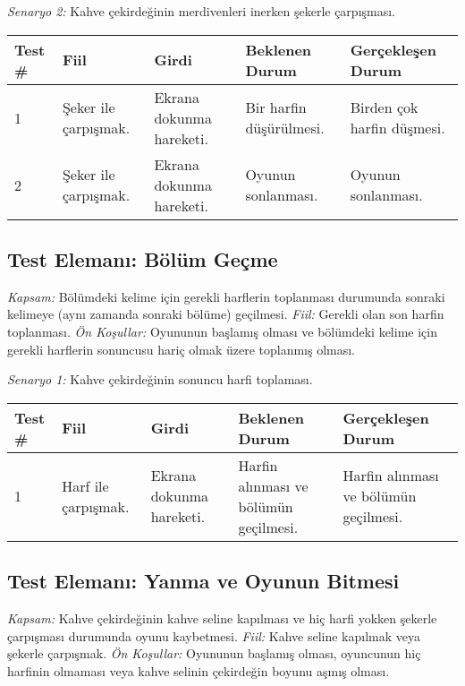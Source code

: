 \documentclass[12pt,a4paper]{article}
\begin{document}
   \textit{Senaryo 2:} Kahve çekirdeğinin merdivenleri inerken şekerle çarpışması.

   \begin{center}
      \begin{tabular}{ | l | p{3cm} | p{3cm} | p{3cm} | p{5cm} | }
      \hline
      Test \# & Fiil & Girdi & Beklenen Durum & Gerçekleşen Durum \\ \hline
      1 & Şeker ile çarpışmak. & Ekrana dokunma hareketi. & Bir harfin düşürülmesi. & Birden çok harfin düşmesi. \\ \hline
      2 & Şeker ile çarpışmak. & Ekrana dokunma hareketi. & Oyunun sonlanması. & Oyunun sonlanması. \\ \hline
      \end{tabular}
   \end{center}

   \subsection{Test Elemanı: Bölüm Geçme}
   \textit{Kapsam:} Bölümdeki kelime için gerekli harflerin toplanması durumunda sonraki kelimeye (aynı zamanda sonraki bölüme) geçilmesi. \newline
   \textit{Fiil:} Gerekli olan son harfin toplanması. \newline
   \textit{Ön Koşullar:} Oyununun başlamış olması ve bölümdeki kelime için gerekli harflerin sonuncusu hariç olmak üzere toplanmış olması. \newline

   \textit{Senaryo 1:} Kahve çekirdeğinin sonuncu harfi toplaması.

   \begin{center}
      \begin{tabular}{ | l | p{3cm} | p{3cm} | p{3cm} | p{5cm} | }
      \hline
      Test \# & Fiil & Girdi & Beklenen Durum & Gerçekleşen Durum \\ \hline
      1 & Harf ile çarpışmak. & Ekrana dokunma hareketi. & Harfin alınması ve bölümün geçilmesi. & Harfin alınması ve bölümün geçilmesi. \\ \hline
      \end{tabular}
   \end{center}

   \subsection{Test Elemanı: Yanma ve Oyunun Bitmesi}
   \textit{Kapsam:} Kahve çekirdeğinin kahve seline kapılması ve hiç harfi yokken şekerle çarpışması durumunda oyunu kaybetmesi. \newline
   \textit{Fiil:} Kahve seline kapılmak veya şekerle çarpışmak. \newline
   \textit{Ön Koşullar:} Oyununun başlamış olması, oyuncunun hiç harfinin olmaması veya kahve selinin çekirdeğin boyunu aşmış olması. \newline
\end{document}
